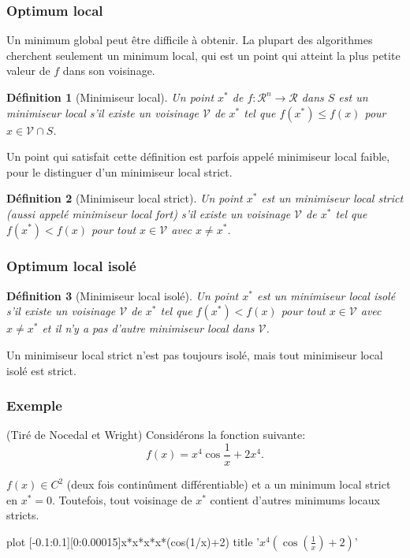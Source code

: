 \documentclass[usepdftitle=false]{beamer}
\def\red{\color{red}}
\def\rit{\mathcal{R}}
\def \gnuplotx {Generate the figures}
\newtheorem{defn}{Définition}
\begin{document}
\begin{frame}
\frametitle{Optimum local}	

Un minimum global peut être difficile à obtenir.
La plupart des algorithmes cherchent seulement un {\red minimum local}, qui est un point qui atteint la plus petite valeur de $f$ dans son voisinage.

\begin{defn}[Minimiseur local]
Un point $x^*$ de $f: \rit^n \rightarrow \rit$ dans $S$ est un minimiseur local s'il existe un voisinage $\mathcal{V}$ de $x^*$ tel que $f(x^*) \leq f(x)$ pour $x \in \mathcal{V} \cap S$.
\end{defn}

Un point qui satisfait cette définition est parfois appelé minimiseur local faible, pour le distinguer d'un minimiseur local strict.

\begin{defn}[Minimiseur local strict]
Un point $x^*$ est un minimiseur local strict (aussi appelé minimiseur local fort) s'il existe un voisinage $\mathcal{V}$ de $x^*$ tel que $f(x^*) < f(x)$ pour tout $x \in \mathcal{V}$ avec $x \ne x^*$.
\end{defn}

\end{frame}

\begin{frame}
\frametitle{Optimum local isolé}	

\begin{defn}[Minimiseur local isolé]
Un point $x^*$ est un minimiseur local isolé s'il existe un voisinage $\mathcal{V}$ de $x^*$ tel que $f(x^*) < f(x)$ pour tout $x \in \mathcal{V}$ avec $x \ne x^*$ et il n'y a pas d'autre minimiseur local dans $\mathcal{V}$.
\end{defn}

\mbox{}

Un minimiseur local strict n'est pas toujours isolé, mais tout minimiseur local isolé est strict.

\end{frame}

\begin{frame}[fragile]
\frametitle{Exemple}

(Tiré de Nocedal et Wright)
Considérons la fonction suivante:
\[
f(x) = x^4 \cos{\frac{1}{x}} +2x^4.
\]

\mbox{}

$f(x) \in C^2$ (deux fois continûment différentiable) et a un minimum local strict en $x^* = 0$.
Toutefois, tout voisinage de $x^*$ contient d'autres minimums locaux stricts.

\begin{center}
	\begin{gnuplot}[terminal=cairolatex,scale=0.5]
plot [-0.1:0.1][0:0.00015]x*x*x*x*(cos(1/x)+2) title '$x^4\left(\cos\left(\frac{1}{x}\right)+2\right)$'
	\end{gnuplot}
\end{center}

\end{frame}
\end{document}
